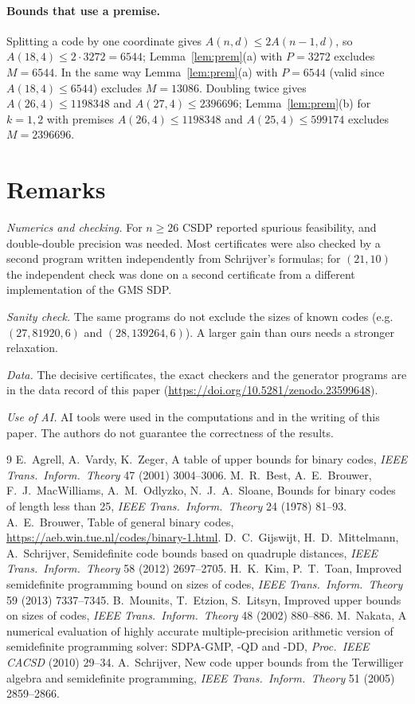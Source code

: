 \documentclass[11pt]{article}
\theoremstyle{remark}
\begin{document}
\paragraph{Bounds that use a premise.} Splitting a code by one coordinate gives $A(n,d)\le2A(n-1,d)$, so
$A(18,4)\le2\cdot3272=6544$; Lemma~\ref{lem:prem}(a) with $P=3272$ excludes $M=6544$. In the same way Lemma~\ref{lem:prem}(a) with $P=6544$ (valid since $A(18,4)\le6544$) excludes $M=13086$. Doubling twice gives
$A(26,4)\le1198348$ and $A(27,4)\le2396696$; Lemma~\ref{lem:prem}(b) for $k=1,2$ with premises
$A(26,4)\le1198348$ and $A(25,4)\le599174$ excludes $M=2396696$.

\section{Remarks}

\emph{Numerics and checking.} For $n\ge26$ CSDP reported spurious feasibility, and double-double precision was
needed. Most certificates were also checked by a second program written independently from Schrijver's
formulas; for $(21,10)$ the independent check was done on a second certificate from a different implementation of
the GMS SDP.

\emph{Sanity check.} The same programs do not exclude the sizes of known codes (e.g.\ $(27,81920,6)$ and
$(28,139264,6)$). A larger gain than ours needs a stronger relaxation.

\emph{Data.} The decisive certificates, the exact checkers and the generator programs are in the data record
of this paper (\url{https://doi.org/10.5281/zenodo.23599648}).

\emph{Use of AI.} AI tools were used in the computations and in the writing of this paper.
The authors do not guarantee the correctness of the results.

\begin{thebibliography}{9}
 E.~Agrell, A.~Vardy, K.~Zeger, A table of upper bounds for binary codes,
\emph{IEEE Trans.\ Inform.\ Theory} 47 (2001) 3004--3006.
 M.~R.~Best, A.~E.~Brouwer, F.~J.~MacWilliams, A.~M.~Odlyzko, N.~J.~A.~Sloane,
Bounds for binary codes of length less than 25, \emph{IEEE Trans.\ Inform.\ Theory} 24 (1978) 81--93.
 A.~E.~Brouwer, Table of general binary codes, \url{https://aeb.win.tue.nl/codes/binary-1.html}.
 D.~C.~Gijswijt, H.~D.~Mittelmann, A.~Schrijver, Semidefinite code bounds based on quadruple distances,
\emph{IEEE Trans.\ Inform.\ Theory} 58 (2012) 2697--2705.
 H.~K.~Kim, P.~T.~Toan, Improved semidefinite programming bound on sizes of codes,
\emph{IEEE Trans.\ Inform.\ Theory} 59 (2013) 7337--7345.
 B.~Mounits, T.~Etzion, S.~Litsyn, Improved upper bounds on sizes of codes,
\emph{IEEE Trans.\ Inform.\ Theory} 48 (2002) 880--886.
 M.~Nakata, A numerical evaluation of highly accurate multiple-precision arithmetic version of
semidefinite programming solver: SDPA-GMP, -QD and -DD, \emph{Proc.\ IEEE CACSD} (2010) 29--34.
 A.~Schrijver, New code upper bounds from the Terwilliger algebra and semidefinite programming,
\emph{IEEE Trans.\ Inform.\ Theory} 51 (2005) 2859--2866.
\end{thebibliography}
\end{document}
